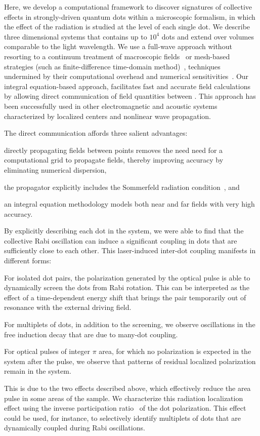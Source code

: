 Here, we develop a computational framework to discover signatures of collective effects in strongly-driven quantum dots within a microscopic formalism, in which the effect of the radiation is studied at the level of each single dot.
We describe three dimensional systems that contains up to $10^4$ dots and extend over volumes comparable to the light wavelength.
We use a full-wave approach without resorting to a continuum treatment of macroscopic fields~\cite{} or mesh-based strategies (such as finite-difference time-domain method)~\cite{Vanneste2001, Fratalocchi2008}, techniques undermined by their computational overhead and numerical sensitivities~\cite{Baczewski2013}.
Our integral equation-based approach, facilitates fast and accurate field calculations by allowing direct communication of field quantities between \qds{}.
This approach has been successfully used in other electromagnetic \cite{otherpapersfromshanker} and acoustic \cite{Glosser2016} systems characterized by localized centers and nonlinear wave propagation.

The direct communication affords three salient advantages:
\begin{inparaenum}[(i)]
  \item directly propagating fields between points removes the need need for a computational grid to propagate fields, thereby improving accuracy by eliminating numerical dispersion,
  \item the propagator explicitly includes the Sommerfeld radiation condition~\cite{Sommerfeld1949}, and
  \item an integral equation methodology models both near and far fields with very high accuracy.
\end{inparaenum}

By explicitly describing each dot in the system, we were able to find that the collective Rabi oscillation can induce a significant coupling in dots that are sufficiently close to each other.
This laser-induced inter-dot coupling manifests in different forms:
\begin{inparaenum}[(i)]
  \item For isolated dot pairs, the polarization generated by the optical pulse is able to dynamically screen the dots from Rabi rotation.
  This can be interpreted as the effect of a time-dependent energy shift that brings the pair temporarily out of resonance with the external driving field.
  \item For multiplets of dots, in addition to the screening, we observe oscillations in the free induction decay that are due to many-dot coupling.
  \item For optical pulses of integer $\pi$ area, for which no polarization is expected in the system after the pulse, we observe that patterns of residual localized polarization remain in the system.
\end{inparaenum}
This is due to the two effects described above, which effectively reduce the area pulse in some areas of the sample.
We characterize this radiation localization effect using the inverse participation ratio~\cite{Schwartz2007} of the dot polarization.
This effect could be used, for instance, to selectively identify multiplets of dots that are dynamically coupled during Rabi oscillations.

